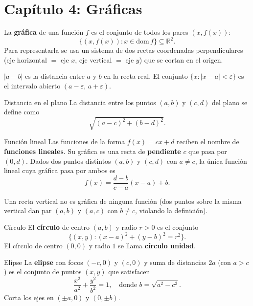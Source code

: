 \documentclass[12pt]{article}
\begin{document}
\section{Capítulo 4: Gráficas}

La \textbf{gráfica} de una función $f$ es el conjunto de todos los pares $(x, f(x))$:
\[ \{(x, f(x)) : x \in \text{dom}\, f\} \subseteq \mathbb{R}^2. \]
Para representarla se usa un sistema de dos rectas coordenadas perpendiculares (eje horizontal $= $ eje $x$, eje vertical $= $ eje $y$) que se cortan en el origen.

\begin{nota}[]{}
$|a - b|$ es la distancia entre $a$ y $b$ en la recta real. El conjunto $\{x : |x - a| < \varepsilon\}$ es el intervalo abierto $(a - \varepsilon,\, a + \varepsilon)$.
\end{nota}

\begin{definicion}[]{Distancia en el plano}
La distancia entre los puntos $(a, b)$ y $(c, d)$ del plano se define como
\[ \sqrt{(a - c)^2 + (b - d)^2}. \]
\end{definicion}

\begin{definicion}[]{Función lineal}
Las funciones de la forma $f(x) = cx + d$ reciben el nombre de \textbf{funciones lineales}. Su gráfica es una recta de \textbf{pendiente} $c$ que pasa por $(0, d)$. Dados dos puntos distintos $(a, b)$ y $(c, d)$ con $a \neq c$, la única función lineal cuya gráfica pasa por ambos es
\[ f(x) = \frac{d - b}{c - a}(x - a) + b. \]
\end{definicion}

\begin{nota}[]{}
Una recta vertical no es gráfica de ninguna función (dos puntos sobre la misma vertical dan par $(a, b)$ y $(a, c)$ con $b \neq c$, violando la definición).
\end{nota}

\begin{definicion}[]{Círculo}
El \textbf{círculo} de centro $(a, b)$ y radio $r > 0$ es el conjunto
\[ \{(x, y) : (x - a)^2 + (y - b)^2 = r^2\}. \]
El círculo de centro $(0,0)$ y radio $1$ se llama \textbf{círculo unidad}.
\end{definicion}

\begin{definicion}[]{Elipse}
La \textbf{elipse} con focos $(-c, 0)$ y $(c, 0)$ y suma de distancias $2a$ (con $a > c$) es el conjunto de puntos $(x, y)$ que satisfacen
\[ \frac{x^2}{a^2} + \frac{y^2}{b^2} = 1, \quad \text{donde } b = \sqrt{a^2 - c^2}. \]
Corta los ejes en $(\pm a, 0)$ y $(0, \pm b)$.
\end{definicion}
\end{document}
